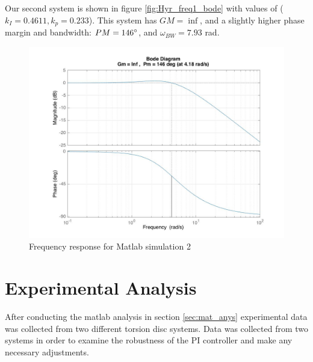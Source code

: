 \documentclass[11pt,titlepage]{article}
\begin{document}
    \noindent Our second system is shown in figure \ref{fig:Hyr_freq1_bode} with values of ($k_I=0.4611, k_p=0.233$). This system has $GM=\inf$, and a slightly higher phase margin and bandwidth: $PM=146\degree$, and $\omega_{BW}=7.93$ rad. 
    \begin{figure}[H]
        \centering
        \includegraphics[scale=.3]{Hyr_freq2_bode}
        \caption{Frequency response for Matlab simulation 2}
        \label{fig:Hyr_freq2_bode}
    \end{figure} 
	 
\section{Experimental Analysis}
    After conducting the matlab analysis in section \ref{sec:mat_anys} experimental data was collected from two different torsion disc systems. Data was collected from two systems in order to examine the robustness of the PI controller and make any necessary adjustments.
\end{document}
